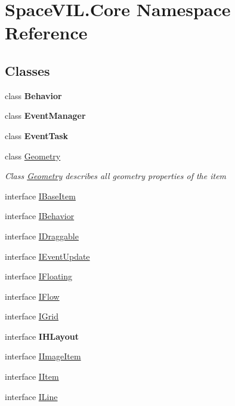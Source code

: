 \hypertarget{namespace_space_v_i_l_1_1_core}{}\section{Space\+V\+I\+L.\+Core Namespace Reference}
\label{namespace_space_v_i_l_1_1_core}
\subsection*{Classes}
\begin{DoxyCompactItemize}
\item 
class {\bfseries Behavior}
\item 
class {\bfseries Event\+Manager}
\item 
class {\bfseries Event\+Task}
\item 
class \mbox{\hyperlink{class_space_v_i_l_1_1_core_1_1_geometry}{Geometry}}
\begin{DoxyCompactList}\small\item\em Class \mbox{\hyperlink{class_space_v_i_l_1_1_core_1_1_geometry}{Geometry}} describes all geometry properties of the item \end{DoxyCompactList}\item 
interface \mbox{\hyperlink{interface_space_v_i_l_1_1_core_1_1_i_base_item}{I\+Base\+Item}}
\item 
interface \mbox{\hyperlink{interface_space_v_i_l_1_1_core_1_1_i_behavior}{I\+Behavior}}
\item 
interface \mbox{\hyperlink{interface_space_v_i_l_1_1_core_1_1_i_draggable}{I\+Draggable}}
\item 
interface \mbox{\hyperlink{interface_space_v_i_l_1_1_core_1_1_i_event_update}{I\+Event\+Update}}
\item 
interface \mbox{\hyperlink{interface_space_v_i_l_1_1_core_1_1_i_floating}{I\+Floating}}
\item 
interface \mbox{\hyperlink{interface_space_v_i_l_1_1_core_1_1_i_flow}{I\+Flow}}
\item 
interface \mbox{\hyperlink{interface_space_v_i_l_1_1_core_1_1_i_grid}{I\+Grid}}
\item 
interface {\bfseries I\+H\+Layout}
\item 
interface \mbox{\hyperlink{interface_space_v_i_l_1_1_core_1_1_i_image_item}{I\+Image\+Item}}
\item 
interface \mbox{\hyperlink{interface_space_v_i_l_1_1_core_1_1_i_item}{I\+Item}}
\item 
interface \mbox{\hyperlink{interface_space_v_i_l_1_1_core_1_1_i_line}{I\+Line}}

\end{DoxyCompactItemize}
